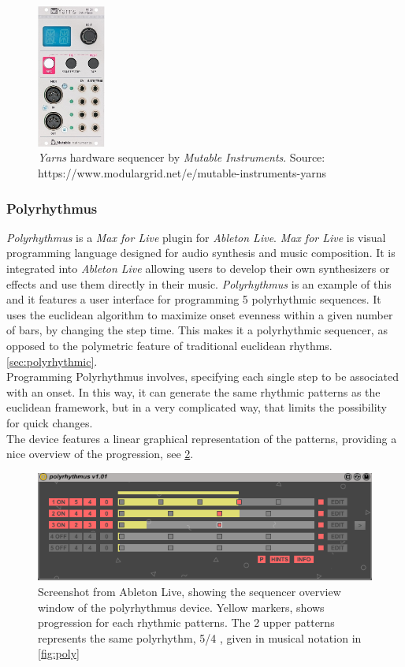 \begin{figure}[H]
    \centering
    \includegraphics[width=0.2\textwidth]{graphics/yarns.jpg}
    \caption{\textit{Yarns} hardware sequencer by \textit{Mutable Instruments}. Source: 
    https://www.modulargrid.net/e/mutable-instruments-yarns}
    \label{fig:yarns}
\end{figure}
\subsubsection{Polyrhythmus}
\textit{Polyrhythmus} is a \textit{Max for Live} plugin for \textit{Ableton Live}. \textit{Max for Live} is visual programming language designed for audio synthesis and music composition. It is integrated into \textit{Ableton Live} allowing users to develop their own synthesizers or effects and use them directly in their music. \textit{Polyrhythmus} is an example of this and it features a user interface for programming 5 polyrhythmic sequences. It uses the euclidean algorithm to maximize onset evenness within a given number of bars, by changing the step time. This makes it a polyrhythmic sequencer, as opposed to the polymetric feature of traditional euclidean rhythms.\cref{sec:polyrhythmic}.\\
Programming Polyrhythmus involves, specifying each single step to be associated with an onset. In this way, it can generate the same rhythmic patterns as the euclidean framework, but in a very complicated way, that limits the possibility for quick changes.\\
The device features a linear graphical representation of the patterns, providing a nice overview of the progression, see \cref{fig:polyrhythmus}.

\begin{figure}[H]
    \centering
    \includegraphics[width=\textwidth]{graphics/polyrhythmus.PNG}
    \caption{Screenshot from Ableton Live, showing the sequencer overview window of the polyrhythmus device. Yellow markers, shows progression for each rhythmic patterns. The 2 upper patterns represents the same polyrhythm, 5/4 , given in musical notation in \cref{fig:poly}}
    \label{fig:polyrhythmus}
\end{figure}

